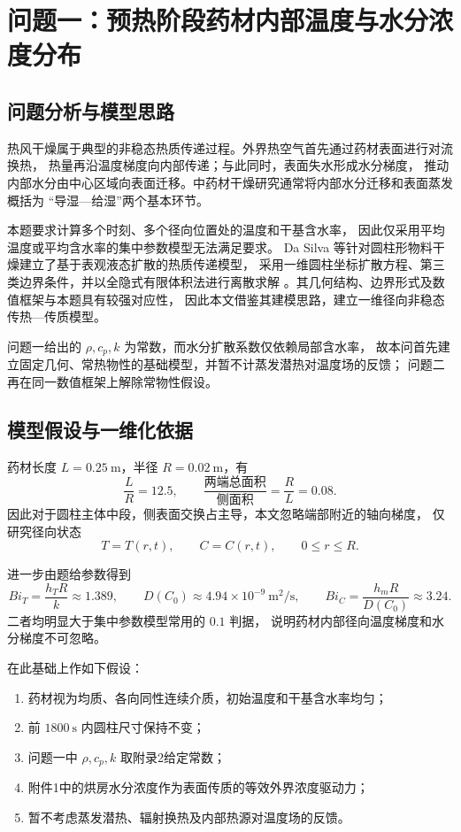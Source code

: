 \documentclass[UTF8,a4paper,11pt]{ctexart}
\begin{document}
\section{问题一：预热阶段药材内部温度与水分浓度分布}

\subsection{问题分析与模型思路}

热风干燥属于典型的非稳态热质传递过程。外界热空气首先通过药材表面进行对流换热，
热量再沿温度梯度向内部传递；与此同时，表面失水形成水分梯度，
推动内部水分由中心区域向表面迁移。中药材干燥研究通常将内部水分迁移和表面蒸发概括为
“导湿—给湿”两个基本环节\cite{wang2024}。

本题要求计算多个时刻、多个径向位置处的温度和干基含水率，
因此仅采用平均温度或平均含水率的集中参数模型无法满足要求。
Da Silva 等针对圆柱形物料干燥建立了基于表观液态扩散的热质传递模型，
采用一维圆柱坐标扩散方程、第三类边界条件，并以全隐式有限体积法进行离散求解
\cite{dasilva2014}。其几何结构、边界形式及数值框架与本题具有较强对应性，
因此本文借鉴其建模思路，建立一维径向非稳态传热—传质模型。

问题一给出的 $\rho,c_p,k$ 为常数，而水分扩散系数仅依赖局部含水率，
故本问首先建立固定几何、常热物性的基础模型，并暂不计蒸发潜热对温度场的反馈；
问题二再在同一数值框架上解除常物性假设。

\subsection{模型假设与一维化依据}

药材长度 $L=0.25~\mathrm m$，半径 $R=0.02~\mathrm m$，有
\[
\frac{L}{R}=12.5,
\qquad
\frac{\text{两端总面积}}{\text{侧面积}}
=\frac{R}{L}=0.08.
\]
因此对于圆柱主体中段，侧表面交换占主导，本文忽略端部附近的轴向梯度，
仅研究径向状态
\[
T=T(r,t),\qquad C=C(r,t),\qquad 0\le r\le R.
\]

进一步由题给参数得到
\[
Bi_T=\frac{h_TR}{k}\approx1.389,
\qquad
D(C_0)\approx4.94\times10^{-9}\ \mathrm{m^2/s},
\qquad
Bi_C=\frac{h_mR}{D(C_0)}\approx3.24.
\]
二者均明显大于集中参数模型常用的 $0.1$ 判据，
说明药材内部径向温度梯度和水分梯度不可忽略。

在此基础上作如下假设：
\begin{enumerate}
    \item 药材视为均质、各向同性连续介质，初始温度和干基含水率均匀；
    \item 前 $1800~\mathrm s$ 内圆柱尺寸保持不变；
    \item 问题一中 $\rho,c_p,k$ 取附录2给定常数；
    \item 附件1中的烘房水分浓度作为表面传质的等效外界浓度驱动力；
    \item 暂不考虑蒸发潜热、辐射换热及内部热源对温度场的反馈。
\end{enumerate}
\end{document}
